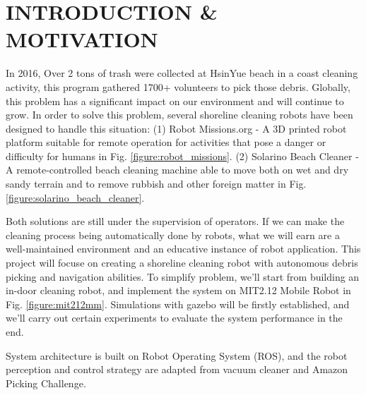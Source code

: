 

\section{INTRODUCTION \& MOTIVATION}

%


%



In 2016, Over 2 tons of trash were collected at HsinYue beach in a coast cleaning activity, this program gathered 1700+ volunteers to pick those debris\cite{liberty_times_net}. Globally, this problem has a significant impact on our environment and will continue to grow.
In order to solve this problem, several shoreline cleaning robots have been designed to handle this situation: 
(1) Robot Missions.org\cite{robot_missions} - A 3D printed robot platform suitable for remote operation for activities that pose a danger or difficulty for humans in Fig. \ref{figure:robot_missions}. 
(2) Solarino Beach Cleaner\cite{solarino_beach_cleaner} - A remote-controlled beach cleaning machine able to move both on wet and dry sandy terrain and to remove rubbish and other foreign matter in Fig. \ref{figure:solarino_beach_cleaner}. 

Both solutions are still under the supervision of operators. If we can make the cleaning process being automatically done by robots, what we will earn are a well-maintained environment and an educative instance of robot application.
This project will focuse on creating a shoreline cleaning robot with autonomous debris picking and navigation abilities. 
To simplify problem, we'll start from building an in-door cleaning robot, and implement the system on MIT2.12 Mobile Robot in Fig. \ref{figure:mit212mm}. Simulations with gazebo will be firstly established, and we'll carry out certain experiments to evaluate the system performance in the end.

System architecture is built on Robot Operating System (ROS), and the robot perception and control strategy are adapted from vacuum cleaner\cite{neato_botvac}\cite{ElvisRuiz_roomba_ros} and Amazon Picking Challenge\cite{NikolausCorrell_apc_review_1}.
